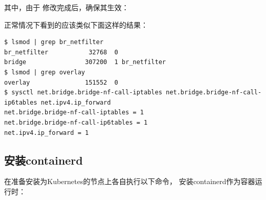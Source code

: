 \documentclass[12pt]{article}
\begin{document}
其中，由于 修改完成后，确保其生效：

\begin{Shaded}
\begin{Highlighting}[]
 \KeywordTok{|} 
 \KeywordTok{|} 
\end{Highlighting}
\end{Shaded}

正常情况下看到的应该类似下面这样的结果：

\begin{verbatim}
$ lsmod | grep br_netfilter
br_netfilter           32768  0
bridge                307200  1 br_netfilter
$ lsmod | grep overlay
overlay               151552  0
$ sysctl net.bridge.bridge-nf-call-iptables net.bridge.bridge-nf-call-ip6tables net.ipv4.ip_forward
net.bridge.bridge-nf-call-iptables = 1
net.bridge.bridge-nf-call-ip6tables = 1
net.ipv4.ip_forward = 1
\end{verbatim}

\subsection{安装containerd}\label{ux5b89ux88c5containerd}

在准备安装为Kubernetes的节点上各自执行以下命令， 安装containerd作为容器运行时：
\end{document}
